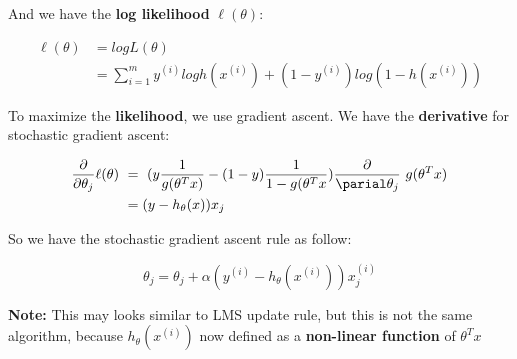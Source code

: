 \documentclass{article}
\begin{document}
\begin{flushleft}
And we have the \textbf{log likelihood} $\ell(\theta)$:
\end{flushleft}

\begin{equation}
\begin{split}
\ell(\theta) &= log L(\theta) \\
             &= \sum_{i=1}^m y^{(i)} log h(x^{(i)}) + (1 - y^{(i)}) log (1 - h(x^{(i)}))
\end{split}
\end{equation}

\begin{flushleft}
To maximize the \textbf{likelihood}, we use gradient ascent. We have the \textbf{derivative} for stochastic gradient ascent:
\end{flushleft}

\begin{equation}
\begin{split}
\frac{\partial}{\partial\theta_{j}}\ell(\theta)\ &=\ (y\frac{1}{g(\theta^{T}x)} - (1-y) \frac{1}{1 - g(\theta^{T}x}) \frac{\partial}{\parial\theta_{j}}\ g(\theta^{T}x) \\
    &= (y - h_{\theta}(x))x_{j}
\end{split}
\end{equation}

\begin{flushleft}
So we have the stochastic gradient ascent rule as follow:
\end{flushleft}

\begin{equation}
\theta_{j} = \theta_{j} + \alpha (y^{(i)} - h_{\theta}(x^{(i)}))x^{(i)}_{j}
\end{equation}

\begin{flushleft}
\textbf{Note:} This may looks similar to LMS update rule, but this is not the same algorithm, because $h_{\theta}(x^{(i)})$ now defined as a \textbf{non-linear function} of $\theta^{T}x$
\end{flushleft}
\end{document}
